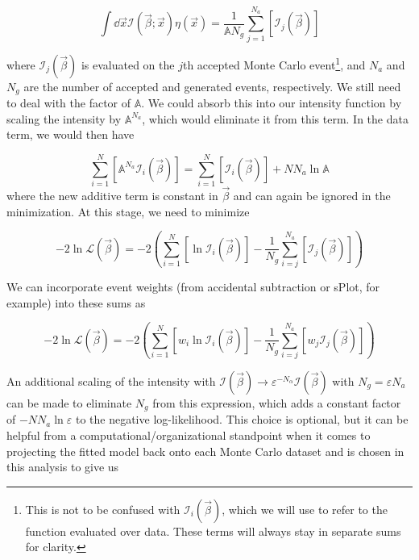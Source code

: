 \begin{equation}
  \int \dd{\vec{x}} \mathcal{I}(\vec{\beta}; \vec{x})\eta(\vec{x}) = \frac{1}{\mathbb{A} N_g} \sum_{j=1}^{N_a} \left[\mathcal{I}_j(\vec{\beta})\right]
\end{equation}

where $\mathcal{I}_j(\vec{\beta})$ is evaluated on the $j$th accepted Monte Carlo event\footnote{This is not to be confused with $\mathcal{I}_i(\vec{\beta})$, which we will use to refer to the function evaluated over data. These terms will always stay in separate sums for clarity.}, and $N_a$ and $N_g$ are the number of accepted and generated events, respectively. We still need to deal with the factor of $\mathbb{A}$. We could absorb this into our intensity function by scaling the intensity by $\mathbb{A}^{N_a}$, which would eliminate it from this term. In the data term, we would then have

\begin{equation}
  \sum_{i=1}^N \left[\mathbb{A}^{N_a}\mathcal{I}_i(\vec{\beta})\right] = \sum_{i=1}^N \left[\mathcal{I}_i(\vec{\beta})\right] + NN_a\ln\mathbb{A}
\end{equation}
where the new additive term is constant in $\vec{\beta}$ and can again be ignored in the minimization. At this stage, we need to minimize

\begin{equation}
  -2\ln\mathcal{L}(\vec{\beta}) = -2\left(\sum_{i=1}^N\left[\ln\mathcal{I}_i(\vec{\beta})\right] - \frac{1}{N_g} \sum_{i=j}^{N_a}\left[\mathcal{I}_j(\vec{\beta})\right]\right)
\end{equation}

We can incorporate event weights (from accidental subtraction or sPlot, for example) into these sums as

\begin{equation}
  -2\ln\mathcal{L}(\vec{\beta}) = -2\left(\sum_{i=1}^N\left[w_i\ln\mathcal{I}_i(\vec{\beta})\right] - \frac{1}{N_g} \sum_{i=j}^{N_a}\left[w_j\mathcal{I}_j(\vec{\beta})\right]\right)
\end{equation}

An additional scaling of the intensity with $\mathcal{I}(\vec{\beta}) \to \varepsilon^{-N_{\alpha}}\mathcal{I}(\vec{\beta})$ with $N_g = \varepsilon N_a$ can be made to eliminate $N_g$ from this expression, which adds a constant factor of $-NN_a\ln\varepsilon$ to the negative log-likelihood. This choice is optional, but it can be helpful from a computational/organizational standpoint when it comes to projecting the fitted model back onto each Monte Carlo dataset and is chosen in this analysis to give us

